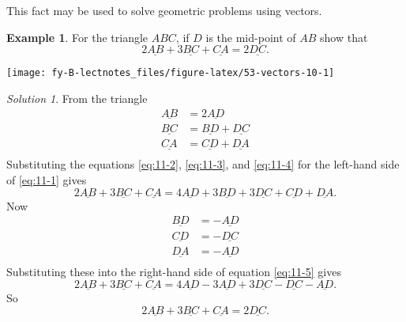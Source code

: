 \documentclass[
  11pt,
  oneside]{book}
\newcommand{\slide}{}
\theoremstyle{definition}
\theoremstyle{definition}
\newtheorem{example}{Example}[chapter]
\theoremstyle{definition}
\theoremstyle{definition}
\theoremstyle{remark}
\newtheorem*{solution}{Solution}
\begin{document}
This fact may be used to solve geometric problems using vectors.

\slide

\begin{example}

For the triangle \(ABC\), if \(D\) is the mid-point of \(AB\) show that
\begin{equation}
2\underline{AB}+3\underline{BC}+\underline{CA} = 2\underline{DC}.
\label{eq:11-1}
\end{equation}

\begin{center}\texttt{[image: fy-B-lectnotes\_files/figure-latex/53-vectors-10-1]} \end{center}

\end{example}

\begin{solution}
From the triangle
\begin{align}
\underline{AB}&=2\underline{AD}
\label{eq:11-2}\\
\underline{BC}&=\underline{BD}+\underline{DC}
\label{eq:11-3}\\
\underline{CA}&=\underline{CD}+\underline{DA}
\label{eq:11-4}\\
\end{align}
Substituting the equations \eqref{eq:11-2}, \eqref{eq:11-3}, and \eqref{eq:11-4} for the left-hand side of \eqref{eq:11-1} gives
\begin{equation}
2\underline{AB}+3\underline{BC}+\underline{CA}=4\underline{AD}+3\underline{BD}+3\underline{DC}+\underline{CD}+\underline{DA}.
\label{eq:11-5}
\end{equation}
Now
\begin{align*}
\underline{BD}&=-\underline{AD}\\
\underline{CD}&=-\underline{DC}\\
\underline{DA}&=-\underline{AD}\\
\end{align*}
Substituting these into the right-hand side of equation \eqref{eq:11-5} gives
\[
2\underline{AB}+3\underline{BC}+\underline{CA}=4\underline{AD}-3\underline{AD}+3\underline{DC}-\underline{DC}-\underline{AD}.
\]
So
\[
2\underline{AB}+3\underline{BC}+\underline{CA} = 2\underline{DC}.
\]
\end{solution}

\slide

\begin{slidesonly}

\hbox{}
\slide

\end{slidesonly}
\end{document}
